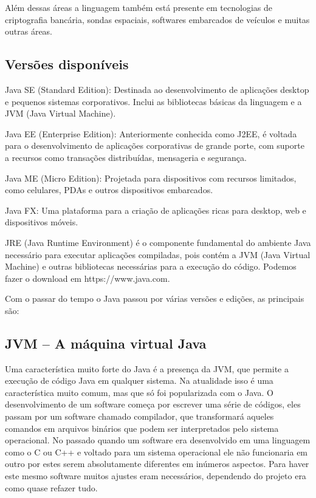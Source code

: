 \documentclass{article}
\begin{document}
Além dessas áreas a linguagem também está presente em tecnologias de criptografia bancária, sondas espaciais, softwares embarcados de veículos e muitas outras áreas.

\subsection{Versões disponíveis}
\justify

\begin{listaLogoJava}
    \item Java SE (Standard Edition): Destinada ao desenvolvimento de aplicações desktop e pequenos sistemas corporativos. Inclui as bibliotecas básicas da linguagem e a JVM (Java Virtual Machine).
    \item Java EE (Enterprise Edition): Anteriormente conhecida como J2EE, é voltada para o desenvolvimento de aplicações corporativas de grande porte, com suporte a recursos como transações distribuídas, mensageria e segurança.
    \item Java ME (Micro Edition): Projetada para dispositivos com recursos limitados, como celulares, PDAs e outros dispositivos embarcados.
    \item Java FX: Uma plataforma para a criação de aplicações ricas para desktop, web e dispositivos móveis.
    \item JRE (Java Runtime Environment) é o componente fundamental do ambiente Java necessário para executar aplicações compiladas, pois contém a JVM (Java Virtual Machine) e outras bibliotecas necessárias para a execução do código. Podemos fazer o download em https://www.java.com.
\end{listaLogoJava}

Com o passar do tempo o Java passou por várias versões e edições, as principais são:

\subsection{JVM – A máquina virtual Java}
\justify

Uma característica muito forte do Java é a presença da JVM, que permite a execução de código Java em qualquer sistema. Na atualidade isso é uma característica muito comum, mas que só foi popularizada com o Java. O desenvolvimento de um software começa por escrever uma série de códigos, eles passam por um software chamado compilador, que transformará aqueles comandos em arquivos binários que podem ser interpretados pelo sistema operacional. \newline
No passado quando um software era desenvolvido em uma linguagem como o C ou C++ e voltado para um sistema operacional ele não funcionaria em outro por estes serem absolutamente diferentes em inúmeros aspectos. Para haver este mesmo software muitos ajustes eram necessários, dependendo do projeto era como quase refazer tudo. \newline
\end{document}
